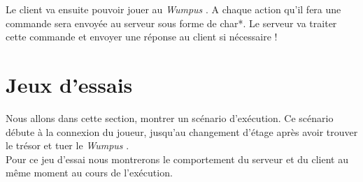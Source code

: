 \documentclass[a4paper,10pt]{article}
\newcommand{\gameName}{\emph{Wumpus }}
\begin{document}
	Le client va ensuite pouvoir jouer au \gameName. A chaque action qu'il fera une commande sera envoyée au serveur sous forme de char*. Le serveur va traiter
	cette commande et envoyer une réponse au client si nécessaire !





	\newpage
	\section{Jeux d'essais}

		Nous allons dans cette section, montrer un scénario d'exécution. Ce scénario débute à la connexion du joueur, jusqu'au changement d'étage après avoir
trouver le trésor et tuer le \gameName.\\

Pour ce jeu d'essai nous montrerons le comportement du serveur et du client au même moment au cours de l'exécution.
\end{document}
